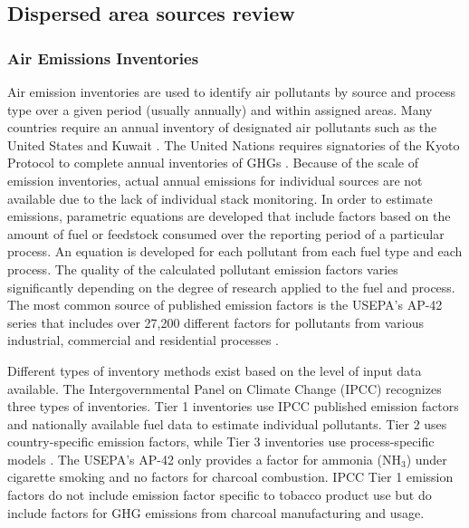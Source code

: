 \clearpage
\subsection{Dispersed area sources review}

\subsubsection{Air Emissions Inventories}

Air emission inventories are used to identify air pollutants by source and process type over a given period (usually annually) and within assigned areas.  Many countries require an annual inventory of designated air pollutants such as the United States \citep{USEPA2014} and Kuwait \citep{KEPA2017}.  The United Nations requires signatories of the Kyoto Protocol to complete annual inventories of GHGs \citep{Paciornik2006}.  Because of the scale of emission inventories, actual annual emissions for individual sources are not available due to the lack of individual stack monitoring. In order to estimate emissions, parametric equations are developed that include factors based on the amount of fuel or feedstock consumed over the reporting period of a particular process.  An equation is developed for each pollutant from each fuel type and each process.  The quality of the calculated pollutant emission factors varies significantly depending on the degree of research applied to the fuel and process.  The most common source of published emission factors is the USEPA’s AP-42 series that includes over 27,200 different factors for pollutants from various industrial, commercial and residential processes \citep{USEPA1995}.

Different types of inventory methods exist based on the level of input data available. The Intergovernmental Panel on Climate Change (IPCC) recognizes three types of inventories.  Tier 1 inventories use IPCC published emission factors and nationally available fuel data to estimate individual pollutants.  Tier 2 uses country-specific emission factors, while Tier 3 inventories use process-specific models \citep{Paciornik2006}.  The USEPA’s AP-42 only provides a factor for ammonia (NH$_{3}$) under cigarette smoking and no factors for charcoal combustion.  IPCC Tier 1 emission factors do not include emission factor specific to tobacco product use but do include factors for GHG emissions from charcoal manufacturing and usage. 

